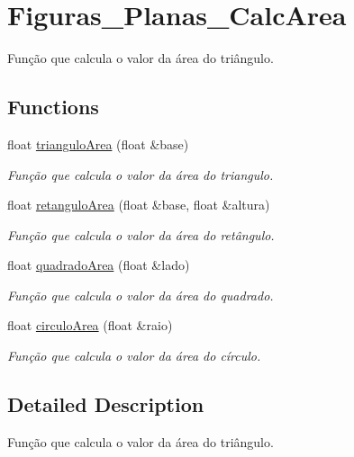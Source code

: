 \hypertarget{group__Figuras__Planas__CalcArea}{}\section{Figuras\+\_\+\+Planas\+\_\+\+Calc\+Area}
\label{group__Figuras__Planas__CalcArea}


Função que calcula o valor da área do triângulo.  


\subsection*{Functions}
\begin{DoxyCompactItemize}
\item 
float \hyperlink{group__Figuras__Planas__CalcArea_gad3dd4559c961d21265a1fe46e7d5c3cc}{triangulo\+Area} (float \&base)
\begin{DoxyCompactList}\small\item\em Função que calcula o valor da área do triangulo. \end{DoxyCompactList}\item 
float \hyperlink{group__Figuras__Planas__CalcArea_gaadec7ea7b857fb93862af9da30f4b896}{retangulo\+Area} (float \&base, float \&altura)
\begin{DoxyCompactList}\small\item\em Função que calcula o valor da área do retângulo. \end{DoxyCompactList}\item 
float \hyperlink{group__Figuras__Planas__CalcArea_gac85a6a6234680349b5b8329d4333567e}{quadrado\+Area} (float \&lado)
\begin{DoxyCompactList}\small\item\em Função que calcula o valor da área do quadrado. \end{DoxyCompactList}\item 
float \hyperlink{group__Figuras__Planas__CalcArea_gac50529a5e8458336df0f0e2329e49833}{circulo\+Area} (float \&raio)
\begin{DoxyCompactList}\small\item\em Função que calcula o valor da área do círculo. \end{DoxyCompactList}\end{DoxyCompactItemize}


\subsection{Detailed Description}
Função que calcula o valor da área do triângulo. 


